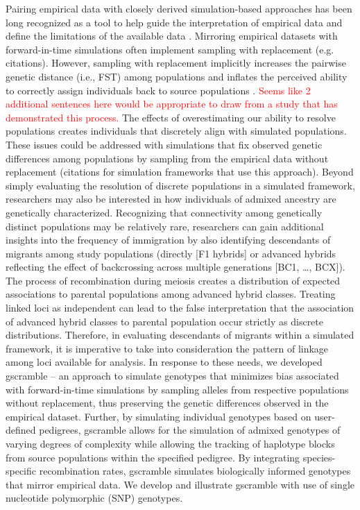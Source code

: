 Pairing empirical data with closely derived simulation-based approaches has been long recognized as a tool to help guide the interpretation of empirical data and define the limitations of the available data \citep{vaha2006efficiency,anderson2008improved,latch2011fine}.  Mirroring empirical datasets with forward-in-time simulations often implement sampling with replacement (e.g. citations).  However, sampling with replacement implicitly increases the pairwise genetic distance (i.e., FST) among populations and inflates the perceived ability to correctly assign individuals back to source populations \cite{almudevar2000exact,anderson2008improved}.  \textcolor{red}{Seems like 2 additional sentences here would be appropriate to draw from a study that has demonstrated this process.}  The effects of overestimating our ability to resolve populations creates individuals that discretely align with simulated populations.  These issues could be addressed with simulations that fix observed genetic differences among populations by sampling from the empirical data without replacement (citations for simulation frameworks that use this approach).
  Beyond simply evaluating the resolution of discrete populations in a simulated framework, researchers may also be interested in how individuals of admixed ancestry are genetically characterized.  Recognizing that connectivity among genetically distinct populations may be relatively rare, researchers can gain additional insights into the frequency of immigration by also identifying descendants of migrants among study populations (directly [F1 hybrids] or advanced hybrids reflecting the effect of backcrossing across multiple generations [BC1, \ldots, BCX]).  The process of recombination during meiosis creates a distribution of expected associations to parental populations among advanced hybrid classes. Treating linked loci as independent can lead to the false interpretation that the association of advanced hybrid classes to parental population occur strictly as discrete distributions.  Therefore, in evaluating descendants of migrants within a simulated framework, it is imperative to take into consideration the pattern of linkage among loci available for analysis.
	In response to these needs, we developed gscramble – an approach to simulate genotypes that minimizes bias associated with forward-in-time simulations by sampling alleles from respective populations without replacement, thus preserving the genetic differences observed in the empirical dataset.  Further, by simulating individual genotypes based on user-defined pedigrees, gscramble allows for the simulation of admixed genotypes of varying degrees of complexity while allowing the tracking of haplotype blocks from source populations within the specified pedigree.  By integrating species-specific recombination rates, gscramble simulates biologically informed genotypes that mirror empirical data.  We develop and illustrate gscramble with use of single nucleotide polymorphic (SNP) genotypes.



